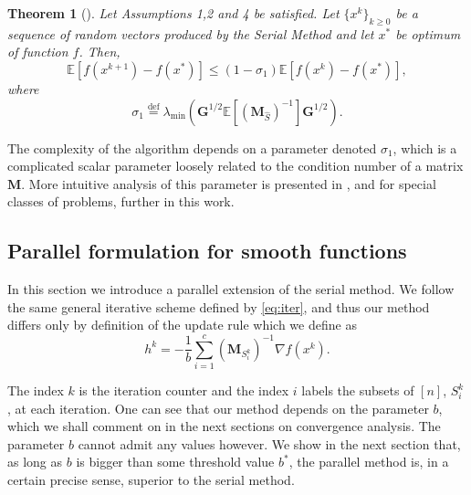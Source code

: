 \documentclass[11pt]{article}
\newtheorem{theorem}{Theorem}
\newcommand{\bM}{\mathbf{M}}
\newcommand{\eqdef}{\overset{\text{def}}{=}}
\begin{document}
	\begin{theorem}[\cite{ESO}]\label{theorem:Serial_Method_1}
		Let Assumptions 1,2 and 4 be satisfied. Let $\{x^k\}_{k\geq0}$ be a sequence of random vectors produced by the Serial Method and let $x^*$ be optimum of function $f$. Then,
		\begin{equation}\label{eq:complexity}
			\mathbb{E}\left[f(x^{k+1})-f(x^*)\right]\leq (1-\sigma_1)\mathbb{E}\left[f(x^k)-f(x^*)\right],
		\end{equation}
		where
		\begin{equation}\label{eq:sigma_1}
			\sigma_1\eqdef\lambda_{\min}\left(\mathbf{G}^{1/2}\mathbb{E}\left[\left(\mathbf{M}_{\hat{S}}\right)^{-1}\right]\mathbf{G}^{1/2}\right).
		\end{equation}
	\end{theorem}
	
	The complexity of the algorithm depends on a parameter denoted $\sigma_1$, which is a complicated scalar parameter loosely related to the condition number of a matrix $\bM$. More intuitive analysis of this parameter is presented in \cite{SDNA}, and for special classes of problems, further in this work.  
	
	
	\subsection{Parallel formulation for smooth functions}
	In this section we introduce a parallel extension of the serial method. We follow the same general iterative scheme defined by \eqref{eq:iter}, and thus our method differs only by definition of the update rule which we define as
	\begin{equation}
		h^k=-\frac{1}{b}\sum_{i=1}^{c}\left(\mathbf{M}_{S^k_i}\right)^{-1}\nabla f(x^k).\label{eq:update}
	\end{equation}

The index $k$ is the iteration counter and the index $i$ labels the subsets of $[n]$, $S^k_i$, at each iteration. One can see that our method depends on the parameter $b$, which we shall comment on  in the next sections on convergence analysis. The parameter $b$ cannot admit any values however. We show in the next section that, as long as $b$ is bigger than some threshold value $b^*$, the parallel method is, in a certain precise sense, superior to the serial method.  
	
\end{document}
